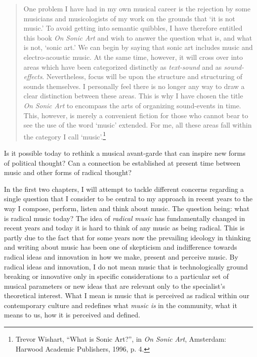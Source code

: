 \begin{quote}
One problem I have had in my own musical career is the rejection by some musicians and musicologists of my work on the grounds that `it is not music.' To avoid getting into semantic quibbles, I have therefore entitled this book \emph{On Sonic Art} and wish to answer the question what is, and what is not, `sonic art.' We can begin by saying that sonic art includes music and electro-acoustic music. At the same time, however, it will cross over into areas which have been categorized distinctly as \emph{text-sound} and as \emph{sound-effects}. Nevertheless, focus will be upon the structure and structuring of sounds themselves. I personally feel there is no longer any way to draw a clear distinction between these areas. This is why I have chosen the title \emph{On Sonic Art} to encompass the arts of organizing sound-events in time. This, however, is merely a convenient fiction for those who cannot bear to see the use of the word `music' extended. For me, all these areas fall within the category I call `music'.\footnote{Trevor Wishart, ``What is Sonic Art?'', in \emph{On Sonic Art}, Amsterdam: Harwood Academic Publishers, 1996, p. 4.}
\end{quote}

Is it possible today to rethink a musical \mbox{avant-garde} that can inspire new forms of political thought? Can a connection be established at present time between music and other forms of radical thought?

In the first two chapters, I will attempt to tackle different concerns regarding a single question that I consider to be central to my approach in recent years to the way I compose, perform, listen and think about music. The question being: what is radical music today? The idea of \emph{radical music} has fundamentally changed in recent years and today it is hard to think of any music as being radical. This is partly due to the fact that for some years now the prevailing ideology in thinking and writing about music has been one of skepticism and indifference towards radical ideas and innovation in how we make, present and perceive music. By radical ideas and innovation, I do not mean music that is technologically ground breaking or innovative only in specific considerations to a particular set of musical parameters or new ideas that are relevant only to the specialist's theoretical interest. What I mean is music that is perceived as radical within our contemporary culture and redefines what \emph{music is} in the community, what it means to us, how it is perceived and defined.

